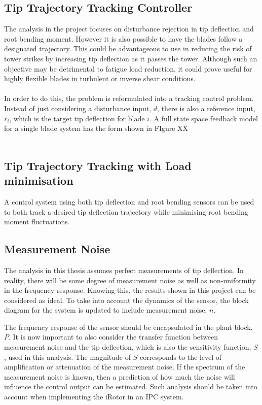 
\subsection{Tip Trajectory Tracking Controller}
The analysis in the project focuses on disturbance rejection in tip deflection and root bending moment. However it is also possible to have the blades follow a designated trajectory. This could be advantageous to use in reducing the risk of tower strikes by increasing tip deflection as it passes the tower. Although such an objective may be detrimental to fatigue load reduction, it could prove useful for highly flexible blades in turbulent or inverse shear conditions. 
\\~\\
In order to do this, the problem is reformulated into a tracking control problem. Instead of just considering a disturbance input, $d$, there is also a reference input, $r_i$, which is the target tip deflection for blade $i$. A full state space feedback model for a single blade system has the form shown in FIgure XX
\\~\\
\subsection{Tip Trajectory Tracking with Load minimisation}
A control system using both tip deflection and root bending sensors can be used to both track a desired tip deflection trajectory while minimising root bending moment fluctuations. 

\subsection{Measurement Noise}
The analysis in this thesis assumes perfect measurements of tip deflection. In reality, there will be some degree of measurement noise as well as non-uniformity in the frequency response. Knowing this, the results shown in this project can be considered as ideal. To take into account the dynamics of the sensor, the block diagram for the system is updated to include measurement noise, $n$.


The frequency response of the sensor should be encapsulated in the plant block, $P$. It is now important to also consider the transfer function between measurement noise and the tip deflection, which is also the sensitivity function, $S$, used in this analysis. The magnitude of $S$ corresponds to the level of amplification or attenuation of the measurement noise. If the spectrum of the measurement noise is known, then a prediction of how much the noise will influence the control output can be estimated. Such analysis should be taken into account when implementing the iRotor in an IPC system.
